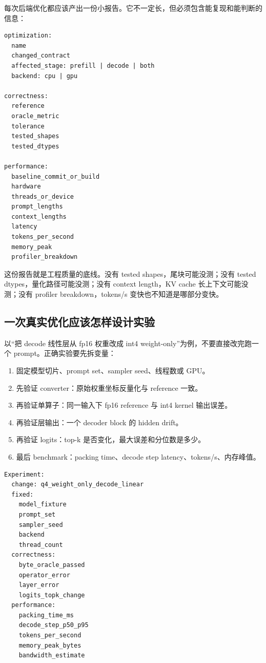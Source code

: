 每次后端优化都应该产出一份小报告。它不一定长，但必须包含能复现和能判断的信息：

\begin{lstlisting}[numbers=none,caption={后端优化报告字段}]
optimization:
  name
  changed_contract
  affected_stage: prefill | decode | both
  backend: cpu | gpu

correctness:
  reference
  oracle_metric
  tolerance
  tested_shapes
  tested_dtypes

performance:
  baseline_commit_or_build
  hardware
  threads_or_device
  prompt_lengths
  context_lengths
  latency
  tokens_per_second
  memory_peak
  profiler_breakdown
\end{lstlisting}

这份报告就是工程质量的底线。没有 tested shapes，尾块可能没测；没有 tested dtypes，量化路径可能没测；没有 context length，KV cache 长上下文可能没测；没有 profiler breakdown，tokens/s 变快也不知道是哪部分变快。

\subsection{一次真实优化应该怎样设计实验}

以“把 decode 线性层从 fp16 权重改成 int4 weight-only”为例，不要直接改完跑一个 prompt。正确实验要先拆变量：

\begin{enumerate}
  \item 固定模型切片、prompt set、sampler seed、线程数或 GPU。
  \item 先验证 converter：原始权重坐标反量化与 reference 一致。
  \item 再验证单算子：同一输入下 fp16 reference 与 int4 kernel 输出误差。
  \item 再验证层输出：一个 decoder block 的 hidden drift。
  \item 再验证 logits：top-k 是否变化，最大误差和分位数是多少。
  \item 最后 benchmark：packing time、decode step latency、tokens/s、内存峰值。
\end{enumerate}

\begin{lstlisting}[numbers=none,caption={单次优化实验记录}]
Experiment:
  change: q4_weight_only_decode_linear
  fixed:
    model_fixture
    prompt_set
    sampler_seed
    backend
    thread_count
  correctness:
    byte_oracle_passed
    operator_error
    layer_error
    logits_topk_change
  performance:
    packing_time_ms
    decode_step_p50_p95
    tokens_per_second
    memory_peak_bytes
    bandwidth_estimate
\end{lstlisting}


